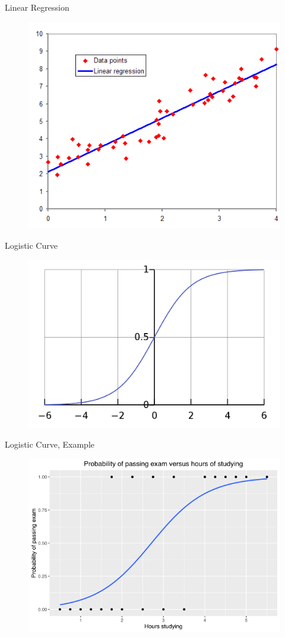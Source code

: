 \documentclass{beamer}
\begin{document}
		\begin{frame}
			Linear Regression
			\begin{figure}
				\centering
				\includegraphics[width=0.7\linewidth]{img/linear-regression}
				\label{fig:linear-regression}
			\end{figure}
		\end{frame}
		\begin{frame}
			Logistic Curve
		\begin{figure}
			\centering
			\includegraphics[width=0.8\linewidth]{img/logistic-curve}
			\label{fig:logistic-curve}
		\end{figure}
	\end{frame}
	\begin{frame}
		Logistic Curve, Example
		\begin{figure}
			\centering
			\includegraphics[width=0.8\linewidth]{img/exam-pass-logistic-curve}
			\label{fig:exam-pass-logistic-curve}
		\end{figure}
	\end{frame}
\end{document}
